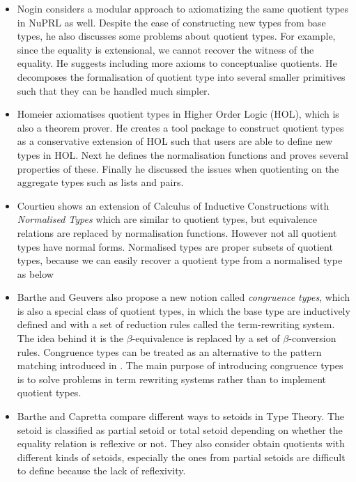 \begin{itemize}
\item Nogin \cite{nog:02} considers a modular approach to axiomatizing the
same quotient types in NuPRL as well. Despite the ease of constructing new types
from base types, he also discusses some
problems about quotient types. For example, since the equality is
extensional, we cannot recover the
witness of the equality.  He suggests including more axioms to
conceptualise quotients. He decomposes the formalisation of quotient type
into several smaller primitives such that they can be handled much
simpler.

\item Homeier \cite{hom} axiomatises quotient types in Higher Order Logic
(HOL), which is also a theorem prover. He creates a tool package to
construct quotient types as a conservative extension of HOL such that
users are able to define new types in HOL. Next he defines the
normalisation functions and proves several properties of
these. Finally he discussed the issues when quotienting on the
aggregate types such as lists and pairs.


\item Courtieu \cite{cou:01} shows an extension of Calculus of Inductive Constructions
with \emph{Normalised Types} which are similar to quotient types, but equivalence relations are replaced by normalisation functions. 
However not all quotient types have normal forms. Normalised types are
proper subsets of quotient types, because we can easily recover a quotient
type from a normalised type as below


\item Barthe and Geuvers \cite{bar:96} also propose a new notion called
\emph{congruence types}, which is also a special class of quotient
types, in which the base type are inductively defined and with a set
of reduction rules called the term-rewriting system. The idea behind
it is the $\beta$-equivalence is replaced by a set of
$\beta$-conversion rules. Congruence types can be treated as an
alternative to the pattern matching introduced in \cite{coq:92}. The main
purpose of introducing congruence types is to solve problems in
term rewriting systems rather than to implement quotient types.


\item Barthe and Capretta \cite{bar:03} compare different ways to setoids in Type Theory.
The setoid is classified as partial setoid or total setoid depending
on whether the equality relation is reflexive or not. They also
consider obtain quotients with different kinds of setoids, especially
the ones from partial setoids are difficult to define because the lack
of reflexivity.


\end{itemize}
